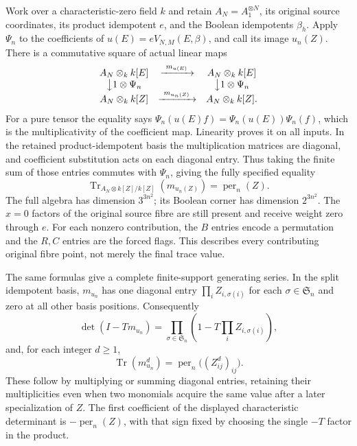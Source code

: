 Work over a characteristic-zero field $k$ and retain $A_N=A_1^{\otimes N}$,
its original source coordinates, its product idempotent $e$, and the
Boolean idempotents $\beta_h$. Apply $\Psi_n$ to the coefficients of
$u(E)=eV_{N,M}(E,\beta)$, and call its image $u_n(Z)$.
There is a commutative square of actual linear maps
\[
\begin{array}{ccc}
 A_N\otimes_k k[E]&\xrightarrow{\ m_{u(E)}\ }&A_N\otimes_k k[E]\\
 \big\downarrow{1\otimes\Psi_n}&&\big\downarrow{1\otimes\Psi_n}\\
 A_N\otimes_k k[Z]&\xrightarrow{\ m_{u_n(Z)}\ }&A_N\otimes_k k[Z].
\end{array}
\]
For a pure tensor the equality says
$\Psi_n(u(E)f)=\Psi_n(u(E))\Psi_n(f)$, which is the multiplicativity
of the coefficient map. Linearity proves it on all inputs.
In the retained product-idempotent basis the multiplication matrices
are diagonal, and coefficient substitution acts on each diagonal entry.
Thus taking the finite sum of those entries commutes with $\Psi_n$,
giving the fully specified equality
\begin{equation}\label{eq:per-original-trace}
 \operatorname{Tr}_{A_N\otimes k[Z]/k[Z]}(m_{u_n(Z)})
        =\operatorname{per}_n(Z).
\end{equation}
The full algebra has dimension $3^{3n^2}$; its Boolean corner has
dimension $2^{3n^2}$. The $x=0$ factors of the original source fibre
are still present and receive weight zero through $e$.
For each nonzero contribution, the $B$ entries encode a permutation
and the $R,C$ entries are the forced flags. This describes every
contributing original fibre point, not merely the final trace value.

The same formulas give a complete finite-support generating series.
In the split idempotent basis, $m_{u_n}$ has one diagonal entry
$\prod_i Z_{i,\sigma(i)}$ for each $\sigma\in\mathfrak S_n$ and
zero at all other basis positions. Consequently
\[
 \det(I-Tm_{u_n})=
 \prod_{\sigma\in\mathfrak S_n}
       \left(1-T\prod_i Z_{i,\sigma(i)}\right),
\]
and, for each integer $d\ge1$,
\[
 \operatorname{Tr}(m_{u_n}^{d})
       =\operatorname{per}_n\bigl((Z_{ij}^{d})_{ij}\bigr).
\]
These follow by multiplying or summing diagonal entries, retaining
their multiplicities even when two monomials acquire the same value
after a later specialization of $Z$. The first coefficient of the
displayed characteristic determinant is $-\operatorname{per}_n(Z)$,
with that sign fixed by choosing the single $-T$ factor in the product.

